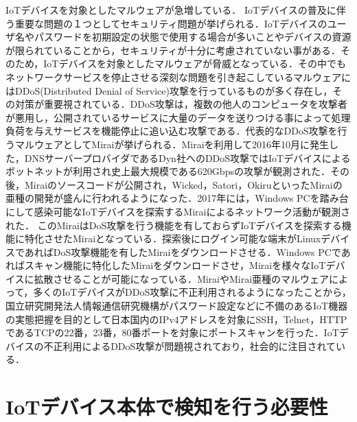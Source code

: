 IoTデバイスを対象としたマルウェアが急増している．
IoTデバイスの普及に伴う重要な問題の１つとしてセキュリティ問題が挙げられる．IoTデバイスのユーザ名やパスワードを初期設定の状態で使用する場合が多いことやデバイスの資源が限られていることから，セキュリティが十分に考慮されていない事がある．そのため，IoTデバイスを対象としたマルウェアが脅威となっている．その中でもネットワークサービスを停止させる深刻な問題を引き起こしているマルウェアにはDDoS(Distributed Denial of Service)攻撃を行っているものが多く存在し，その対策が重要視されている．DDoS攻撃は，複数の他人のコンピュータを攻撃者が悪用し，公開されているサービスに大量のデータを送りつける事によって処理負荷を与えサービスを機能停止に追い込む攻撃である．代表的なDDoS攻撃を行うマルウェアとしてMirai\cite{Mirai}が挙げられる．Miraiを利用して2016年10月に発生した，DNSサーバープロバイダであるDyn社へのDDoS攻撃ではIoTデバイスによるボットネットが利用され史上最大規模である620Gbpsの攻撃が観測された\cite{Dyn}．その後，Miraiのソースコード\cite{code}が公開され，Wicked\cite{Wicked}，Satori\cite{Satori}，Okiru\cite{Okiru}といったMiraiの亜種の開発が盛んに行われるようになった．2017年には，Windows PCを踏み台にして感染可能なIoTデバイスを探索するMiraiによるネットワーク活動が観測された\cite{newMirai}．
このMiraiはDoS攻撃を行う機能を有しておらずIoTデバイスを探索する機能に特化させたMiraiとなっている．探索後にログイン可能な端末がLinuxデバイスであればDoS攻撃機能を有したMiraiをダウンロードさせる．Windows PCであればスキャン機能に特化したMiraiをダウンロードさせ，Miraiを様々なIoTデバイスに拡散させることが可能になっている．MiraiやMirai亜種のマルウェアによって，多くのIoTデバイスがDDoS攻撃に不正利用されるようになったことから，国立研究開発法人情報通信研究機構がパスワード設定などに不備のあるIoT機器の実態把握を目的として日本国内のIPv4アドレスを対象にSSH，Telnet，HTTPであるTCPの22番，23番，80番ポートを対象にポートスキャンを行った\cite{国立}．IoTデバイスの不正利用によるDDoS攻撃が問題視されており，社会的に注目されている．

\section{IoTデバイス本体で検知を行う必要性}

